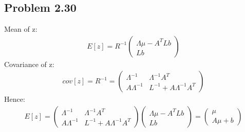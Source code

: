 \documentclass[12pt]{article}
\begin{document}
    \subsection*{Problem 2.30}
    Mean of z:
    \begin{align*}
        E[z] = R^{-1} \begin{pmatrix}
            \Lambda\mu - A^TLb \\
            Lb 
        \end{pmatrix}
    \end{align*}
    Covariance of z:
    \begin{align*}
        cov[z] = R^{-1} = \begin{pmatrix}
            \Lambda^{-1} & \Lambda^{-1}A^T \\
            A\Lambda^{-1} & L^{-1} + A\Lambda^{-1}A^T
        \end{pmatrix}
    \end{align*}
    Hence:
    \begin{align*}
        E[z] = \begin{pmatrix}
            \Lambda^{-1} & \Lambda^{-1}A^T \\
            A\Lambda^{-1} & L^{-1} + A\Lambda^{-1}A^T
        \end{pmatrix} \begin{pmatrix}
            \Lambda\mu - A^TLb \\
            Lb 
        \end{pmatrix} = \begin{pmatrix}
            \mu \\
            A\mu + b
        \end{pmatrix}
    \end{align*}
\end{document}
